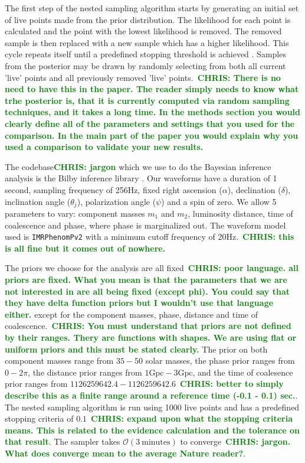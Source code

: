 \documentclass[%
showpacs,
 amsmath,amssymb,
 aps,
 twocolumn,
 prl,
 reprint,
floatfix,
]{revtex4-1}
\newcommand{\chris}[1]{\textbf{\textcolor{green}{CHRIS: #1}}}
\begin{document}
%
%
The first step of the nested sampling algorithm starts by generating an initial
set of live points made from the prior distribution. The likelihood for each
point is calculated and the point with the lowest likelihood is removed. The
removed sample is then replaced with a new sample which has a higher
likelihood. This cycle repeats itself until a predefined stopping threshold is
achieved \cite{1409.7215} . Samples from the posterior may be drawn by randomly
selecting from both all current 'live' points and all previously removed 'live'
points.~\chris{There is no need to have this in the paper. The reader simply
needs to know what trhe posterior is, that it is currently computed via random
sampling techniques, and it takes a long time. In the methods section you would
clearly define all of the parameters and settings that you used for the
comparison. In the main part of the paper you would explain why you used a
comparison to validate your new results.}

%
%
The codebase\chris{jargon} which we use to do the Bayesian inference analysis is the Bilby
inference library \cite{1811.02042} . Our waveforms have a duration of 1
second, sampling frequency of 256Hz, fixed right ascension ($\alpha$),
declination ($\delta$), inclination angle ($\theta_j$), polarization angle
($\psi$) and a spin of zero. We allow 5 parameters to vary: component masses
$m_1$ and $m_2$, luminosity distance, time of coalescence and phase, where
phase is marginalized out. The waveform model used is \texttt{IMRPhenomPv2}
\cite{1809.10113} with a minimum cutoff frequency of 20Hz.~\chris{this is all
fine but it comes out of nowhere.}

%
%
The priors we choose for the analysis are all fixed~\chris{poor language.
all priors are fixed. What you mean is that the parameters that we are not
interested in are all being fixed (except phi). You could say that they have delta function
priors but I wouldn't use that language either.} except for the component
masses, phase, distance and time of coalescence.~\chris{You must understand
that priors are not defined by their ranges. Thery are functions with shapes.
We are using flat or uniform priors and this must be stated clearly.} The prior on both component
masses range from $35 - 50$ solar masses, the phase prior ranges from $0 -
2\pi$, the distance prior ranges from $1\textrm{Gpc} - 3\textrm{Gpc}$, and the
time of coalesence prior ranges from $1126259642.4 -
1126259642.6$~\chris{better to simply describe this as a finite range around a
reference time (-0.1 - 0.1) sec.}. The nested sampling algorithm is run using
1000 live points and has a predefined stopping criteria of $0.1$~\chris{expand
upon what the stopping criteria means. This is related to the evidence
calculation and the tolerance on that result}. The sampler takes $\mathcal{O}(3
\: \textrm{minutes})$ to converge~\chris{jargon. What does converge mean to the
average Nature reader?}.
\end{document}
